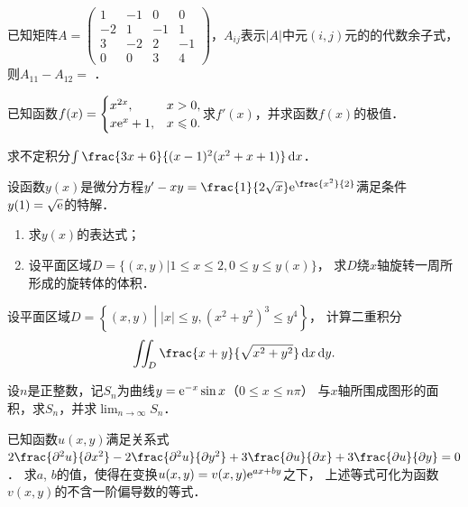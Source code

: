 \documentclass[plain,noanswer,medmath]{../../template/jnuexam}
\begin{document}
\begin{problem}
已知矩阵$A = \begin{pmatrix}
   1 & -1 &  0 & 0 \\
  -2 &  1 & -1 & 1 \\
   3 & -2 &  2 & -1 \\
   0 &  0 &  3 & 4
\end{pmatrix}$，$A_{ij}$表示$|A|$中元$(i,j)$元的的代数余子式，则$A_{11} - A_{12} =$ \fillin{}．
\end{problem}




\begin{problem}[points=10]
已知函数$f(x) = \begin{cases}
     x^{2x}, & x > 0, \\
  x\mathrm{e}^x + 1, & x \leqslant 0.
\end{cases}$求$f'(x)$，并求函数$f(x)$的极值．
\end{problem}


\begin{problem}[points=10]
求不定积分$\int \frac{3x + 6}{(x - 1)^2(x^2 + x + 1)}\dx$．
\end{problem}


\begin{problem}[points=10]
设函数$y(x)$是微分方程$y'-xy=\frac{1}{2\sqrt{x}}\e^{\frac{x^2}{2}}$满足条件$y(1)=\sqrt{\mathrm{e}}$的特解．
\begin{enumerate}
\item 求$y(x)$的表达式；
\item 设平面区域$D = \{(x,y)|1 \le x \le 2,0 \le y \le y(x)\}$，
      求$D$绕$x$轴旋转一周所形成的旋转体的体积．
\end{enumerate}
\end{problem}


\begin{problem}[points=10]
设平面区域$D = \left\{(x,y)\middle||x| \le y, (x^2 + y^2)^3 \le y^4\right\}$，
计算二重积分$$\iint_D \frac{x + y}{\sqrt{x^2 + y^2}}\dx\dy.$$
\end{problem}


\begin{problem}[points=10]%
设$n$是正整数，记$S_n$为曲线$y = \mathrm{e}^{- x}\sin x$（$0 \le x \le n\pi$）%
与$x$轴所围成图形的面积，求$S_n$，并求$\lim_{n \to \infty} S_n$．
\end{problem}


\begin{problem}[points=11]
已知函数$u(x,y)$满足关系式
$2\frac{\pd^2 u}{\pd x^2} - 2\frac{\pd^2 u}{\pd y^2} + 3\frac{\pdu}{\pdx} + 3\frac{\pdu}{\pdy} = 0$．
求$a$, $b$的值，使得在变换$u(x,y) = v(x,y) \mathrm{e}^{ax + by}$之下，
上述等式可化为函数$v(x,y)$的不含一阶偏导数的等式．
\end{problem}
\end{document}
